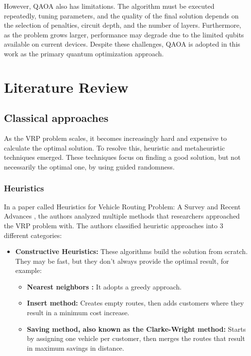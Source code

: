 \documentclass[a4paper]{report}
\begin{document}
{\begin{itemize}
However, QAOA also has limitations. The algorithm must be executed repeatedly, tuning parameters, and the quality of the final solution depends on the selection of penalties, circuit depth, and the number of layers. Furthermore, as the problem grows larger, performance may degrade due to the limited qubits available on current devices. Despite these challenges, QAOA is adopted in this work as the primary quantum optimization approach.



\section{Literature Review}
\subsection{Classical approaches}

As the VRP problem scales, it becomes increasingly hard and expensive to calculate the optimal solution. To resolve this, heuristic and metaheuristic techniques emerged. These techniques focus on finding a good solution, but not necessarily the optimal one, by using guided randomness.
\subsubsection{Heuristics}
In a paper called Heuristics for Vehicle Routing Problem: A Survey and Recent Advances \cite{heuristics}, the authors analyzed multiple methods that researchers approached the VRP problem with. The authors classified  heuristic approaches into 3 different categories:
\begin{itemize}
    \item \textbf{Constructive Heuristics:} These algorithms build the solution from scratch. They may be fast, but they don't always provide the optimal result, for example:
    
    \begin{itemize}
        \item \textbf{Nearest neighbors :} It adopts a greedy approach.
        
        \item \textbf{Insert method:} Creates empty routes, then adds customers where they result in a minimum cost increase.
        
        \item \textbf{Saving method, also known as the Clarke-Wright method:} Starts by assigning one vehicle per customer, then merges the routes that result in maximum savings in distance.
        

\end{itemize}
\end{itemize}
\end{itemize}}
\end{document}
